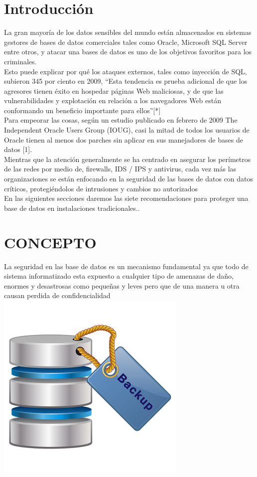 \documentclass[conference]{IEEEtran}
\begin{document}
\section{Introducci\'on}
La gran mayoría de los datos sensibles del mundo están almacenados en sistemas gestores de bases de datos comerciales tales como Oracle, Microsoft SQL Server entre otros, y atacar una bases de datos es uno de los objetivos favoritos para los criminales.
\\
Esto puede explicar por qué los ataques externos, tales como inyección de SQL, subieron 345 por ciento en 2009, “Esta tendencia es prueba adicional de que los agresores tienen éxito en hospedar páginas Web maliciosas, y de que las vulnerabilidades y explotación en relación a los navegadores Web están conformando un beneficio importante para ellos”[*]
\\
Para empeorar las cosas, según un estudio publicado en febrero de 2009 The Independent Oracle Users Group (IOUG), casi la mitad de todos los usuarios de Oracle tienen al menos dos parches sin aplicar en sus manejadores de bases de datos [1].
\\
 Mientras que la atención generalmente se ha centrado en asegurar los perímetros de las redes por medio de, firewalls, IDS / IPS y antivirus, cada vez más las organizaciones se están enfocando en la seguridad de las bases de datos con datos críticos, protegiéndolos de intrusiones y cambios no autorizados
\\
En las siguientes secciones daremos las siete recomendaciones para proteger una base de datos en instalaciones tradicionales..
\\

\section{CONCEPTO}

La seguridad en las base de datos es un mecanismo fundamental ya que todo de sistema informatizado esta expuesto a cualquier tipo de amenazas de daño, enormes y desastrosas como pequeñas y leves pero que de una manera u otra causan perdida de confidencialidad
\\
\centering
\includegraphics[scale=0.5]{Imagenes/backup.jpg}
\end{document}
